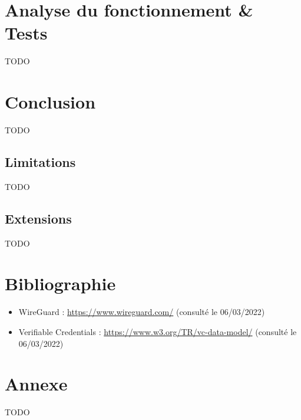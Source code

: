 \documentclass[12pt, openany]{report}
\begin{document}
\section{Analyse du fonctionnement \& Tests}
\noindent 
\begin{flushleft}
TODO
\end{flushleft}

\section{Conclusion}
\noindent 
\begin{flushleft}
TODO
\end{flushleft}
\subsection{Limitations}
\noindent 
\begin{flushleft}
TODO
\end{flushleft}
\subsection{Extensions}
\noindent 
\begin{flushleft}
TODO
\end{flushleft}

\section{Bibliographie}
\noindent 
\begin{itemize}

\item WireGuard : \url{https://www.wireguard.com/} (consulté le 06/03/2022) \\
\item Verifiable Credentials : \url{https://www.w3.org/TR/vc-data-model/} (consulté le 06/03/2022) \\

\end{itemize}

\section{Annexe}
\noindent 
\begin{flushleft}
TODO
\end{flushleft}
\end{document}
